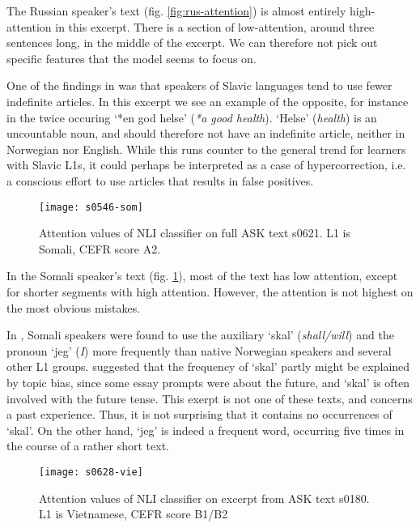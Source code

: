 The Russian speaker's text (fig. \ref{fig:rus-attention}) is almost entirely
high-attention in this excerpt. There is a section of low-attention, around
three sentences long, in the middle of the excerpt. We can therefore not pick
out specific features that the model seems to focus on.

One of the findings in \textcite{pepper2012} was that speakers of Slavic
languages tend to use fewer indefinite articles. In this excerpt we see an
example of the opposite, for instance in the twice occuring `*en god helse'
(\emph{*a good health}). `Helse' (\emph{{health}}) is an uncountable noun,
and should therefore not have an indefinite article, neither in Norwegian nor
English. While this runs counter to the general trend for learners with
Slavic \acp{L1}, it could perhaps be interpreted as a case of
hypercorrection, i.e. a conscious effort to use articles that results in
false positives.

\begin{figure}
  \centering
  \texttt{[image: s0546-som]}
  \caption[Attention in a text by a Somali speaker]{
    Attention values of NLI classifier on full ASK text s0621. L1 is Somali,
    CEFR score A2.
  }
  \label{fig:som-attention}
\end{figure}

In the Somali speaker's text (fig. \ref{fig:som-attention}), most of the text
has low attention, except for shorter segments with high attention. However,
the attention is not highest on the most obvious mistakes.

In \textcite{pepper2012}, Somali speakers were found to use the auxiliary
`skal' (\emph{shall/will}) and the pronoun `jeg' (\emph{I}) more frequently
than native Norwegian speakers and several other L1 groups.
\citeauthor{pepper2012} suggested that the frequency of `skal' partly might
be explained by topic bias, since some essay prompts were about the future,
and `skal' is often involved with the future tense. This exerpt is not one of
these texts, and concerns a past experience. Thus, it is not surprising that
it contains no occurrences of `skal'. On the other hand, `jeg' is indeed a
frequent word, occurring five times in the course of a rather short text.

\begin{figure}
  \centering
  \texttt{[image: s0628-vie]}
  \caption[Attention in a text by a Vietnamese speaker]{
    Attention values of NLI classifier on excerpt from ASK text s0180. L1 is
    Vietnamese, CEFR score B1/B2
  }
  \label{fig:vie-attention}
\end{figure}

